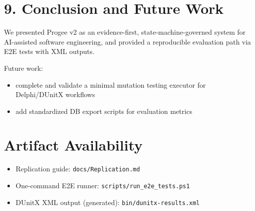 \documentclass[11pt]{article}
\begin{document}
\section{9. Conclusion and Future Work}
We presented Progee v2 as an evidence-first, state-machine-governed system for AI-assisted software engineering, and provided a reproducible evaluation path via E2E tests with XML outputs.

Future work:
\begin{itemize}
\item complete and validate a minimal mutation testing executor for Delphi/DUnitX workflows
\item add standardized DB export scripts for evaluation metrics
\end{itemize}

\section{Artifact Availability}
\begin{itemize}
\item Replication guide: \texttt{docs/Replication.md}
\item One-command E2E runner: \texttt{scripts/run\_e2e\_tests.ps1}
\item DUnitX XML output (generated): \texttt{bin/dunitx-results.xml}
\end{itemize}
\end{document}
